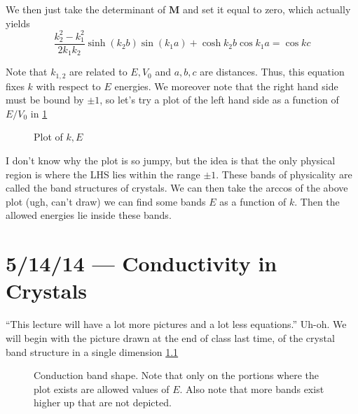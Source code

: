 \documentclass[10pt]{report}
\begin{document}
We then just take the determinant of $\mathbf{M}$ and set it equal to zero, which actually yields 
\begin{equation}
    \frac{k_2^2 - k_1^2}{2k_1k_2}\sinh(k_2b)\sin(k_1a) + \cosh k_2b \cos k_1a = \cos kc
\end{equation}

Note that $k_{1,2}$ are related to $E, V_0$ and $a,b,c$ are distances. Thus, this equation fixes $k$ with respect to $E$ energies. We moreover note that the right hand side must be bound by $\pm 1$, so let's try a plot of the left hand side as a function of $E/V_0$ in \ref{5.12.plot}
\begin{figure}[!h]
    \centering
    \caption{Plot of $k,E$}
    \label{5.12.plot}
\end{figure}

I don't know why the plot is so jumpy, but the idea is that the only physical region is where the LHS lies within the range $\pm 1$. These bands of physicality are called the band structures of crystals. We can then take the arccos of the above plot (ugh, can't draw) we can find some bands $E$ as a function of $k$. Then the allowed energies lie inside these bands.
\chapter{5/14/14 --- Conductivity in Crystals}

``This lecture will have a lot more pictures and a lot less equations.'' Uh-oh. We will begin with the picture drawn at the end of class last time, of the crystal band structure in a single dimension \ref{5.14.1D}
\begin{figure}[!h]
    \centering
    \caption{Conduction band shape. Note that only on the portions where the plot exists are allowed values of $E$. Also note that more bands exist higher up that are not depicted.}
    \label{5.14.1D}
\end{figure}
\end{document}
